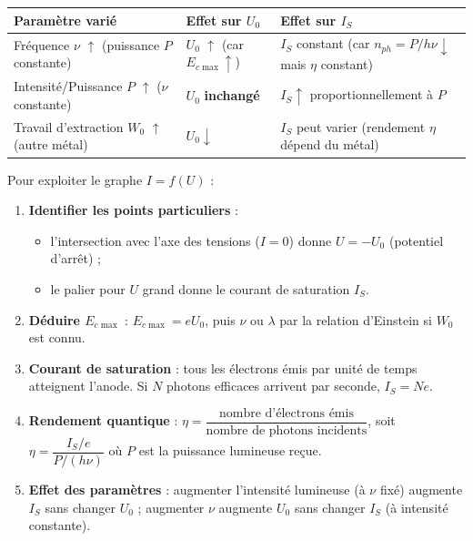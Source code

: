 \documentclass[11pt]{article}
\begin{document}
\begin{propriete}[Influence des paramètres sur la caractéristique $I=f(U)$]
\begin{center}
\begin{tabularx}{\linewidth}{|l|X|X|}\hline
\textbf{Paramètre varié} & \textbf{Effet sur $U_0$} & \textbf{Effet sur $I_S$} \\ \hline
Fréquence $\nu$ $\uparrow$ (puissance $P$ constante) & $U_0$ $\uparrow$ (car $E_{c\max} \uparrow$) & $I_S$ constant (car $n_{ph} = P/h\nu \downarrow$ mais $\eta$ constant) \\ \hline
Intensité/Puissance $P$ $\uparrow$ ($\nu$ constante) & $U_0$ \textbf{inchangé} & $I_S \uparrow$ proportionnellement à $P$ \\ \hline
Travail d'extraction $W_0$ $\uparrow$ (autre métal) & $U_0 \downarrow$ & $I_S$ peut varier (rendement $\eta$ dépend du métal) \\ \hline
\end{tabularx}
\end{center}
\end{propriete}

\begin{methode}
Pour exploiter le graphe $I = f(U)$ :
\begin{enumerate}
\item \textbf{Identifier les points particuliers} :
\begin{itemize}
\item l'intersection avec l'axe des tensions ($I = 0$) donne $U = -U_0$ (potentiel d'arrêt) ;
\item le palier pour $U$ grand donne le courant de saturation $I_S$.
\end{itemize}
\item \textbf{Déduire $E_{c\max}$} : $E_{c\max} = eU_0$, puis $\nu$ ou $\lambda$ par la relation d'Einstein si $W_0$ est connu.
\item \textbf{Courant de saturation} : tous les électrons émis par unité de temps atteignent l'anode. Si $N$ photons efficaces arrivent par seconde, $I_S = Ne$.
\item \textbf{Rendement quantique} : $\eta = \dfrac{\text{nombre d'électrons émis}}{\text{nombre de photons incidents}}$, soit $\eta = \dfrac{I_S/e}{P/(h\nu)}$ où $P$ est la puissance lumineuse reçue.
\item \textbf{Effet des paramètres} : augmenter l'intensité lumineuse (à $\nu$ fixé) augmente $I_S$ sans changer $U_0$ ; augmenter $\nu$ augmente $U_0$ sans changer $I_S$ (à intensité constante).
\end{enumerate}
\end{methode}
\end{document}
